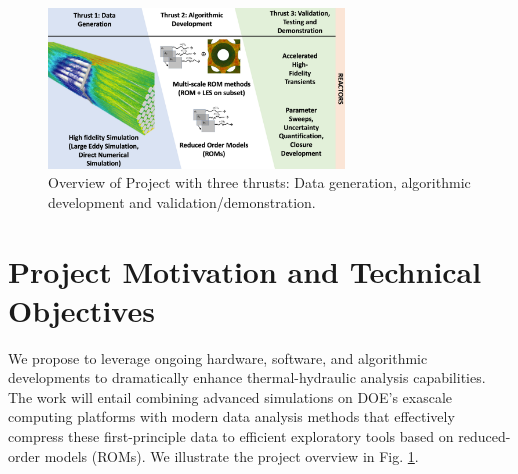 \begin{figure}[t!] \centering
    \includegraphics[width = 0.70\textwidth]{figs/overview.png}
    \caption{Overview of Project with three thrusts: Data generation,
             algorithmic development and validation/demonstration.  \label{fig:sum}}
\end{figure}


\section{Project Motivation and Technical Objectives}

We propose to leverage ongoing hardware, software, and algorithmic developments
to dramatically enhance thermal-hydraulic analysis capabilities.  The work will
entail combining advanced simulations on DOE's exascale computing platforms
with modern data analysis methods that effectively compress these
first-principle data to efficient exploratory tools based on reduced-order
models (ROMs).
We illustrate the project overview in Fig. \ref{fig:sum}.


